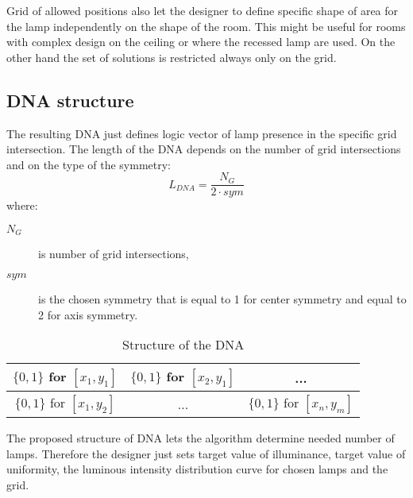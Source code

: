 Grid of allowed positions also let the designer to define specific shape of area for the lamp independently on the shape of the room. This might be useful for rooms with complex design on the ceiling or where the recessed lamp are used. On the other hand the set of solutions is restricted always only on the grid.

\subsection{DNA structure}
\label{ssec:dnaStruc}
The resulting DNA just defines logic vector of lamp presence in the specific grid intersection. The length of the DNA depends on the number of grid intersections and on the type of the symmetry:
\begin{equation}
\label{eq:DNALength}
L_{DNA} = \frac{N_G}{2\cdot sym}
\end{equation}
where:
\begin{description}
	\item[$N_G$] is number of grid intersections,
	\item[$sym$] is the chosen symmetry that is equal to 1 for center symmetry and equal to 2 for axis symmetry.
\end{description}

\begin{table}[htb]
	\renewcommand{\arraystretch}{1.3}
	\caption{Structure of the DNA}
 	\label{tab:onesideLamps}
	\centering
  \begin{tabular}{| c | c | c |}
    \hline
    $\lbrace0,1\rbrace$ for $[x_1,y_1]$ & $\lbrace0,1\rbrace$ for $[x_2,y_1]$ & ... \\
    \hline
    $\lbrace0,1\rbrace$ for $[x_1,y_2]$ & ... & $\lbrace0,1\rbrace$ for $[x_n,y_m]$ \\
    \hline
  \end{tabular}
\end{table}

The proposed structure of DNA lets the algorithm determine needed number of lamps. Therefore the designer just sets target value of illuminance, target value of uniformity, the luminous intensity distribution curve for chosen lamps and the grid.
